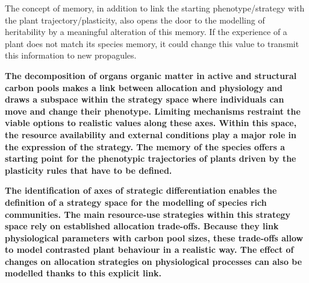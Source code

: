  
 The concept of memory, in addition to link the starting phenotype/strategy with the plant trajectory/plasticity, also opens the door to the modelling of heritability by a meaningful alteration of this memory. If the experience of a plant does not match its species memory, it could change this value to transmit this information to new propagules.

%

%





\textbf{The decomposition of organs organic matter in active and structural carbon pools makes a link between allocation and physiology and draws a subspace within the strategy space where individuals can move and change their phenotype. Limiting mechanisms restraint the viable options to realistic values along these axes. Within this space, the resource availability and external conditions play a major role in the expression of the strategy. The memory of the species offers a starting point for the phenotypic trajectories of plants driven by the plasticity rules that have to be defined.\\ %
}


\textbf{The identification of axes of strategic differentiation enables the definition of a strategy space for the modelling of species rich communities. The main resource-use strategies within this strategy space rely on established allocation trade-offs. Because they link physiological parameters with carbon pool sizes, these trade-offs allow to model contrasted plant behaviour in a realistic way. The effect of changes on allocation strategies on physiological processes can also be modelled thanks to this explicit link.}

